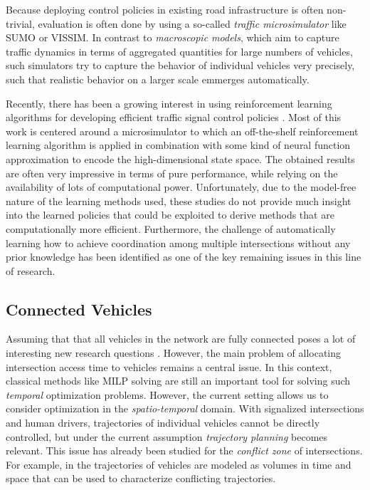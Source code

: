 \documentclass{article}
\begin{document}

Because deploying control policies in existing road infrastructure is often
non-trivial, evaluation is often done by using a so-called \textit{traffic
microsimulator} like SUMO \cite{lopez_microscopic_2018} or VISSIM. In contrast to
\textit{macroscopic models}, which aim to capture traffic dynamics in terms of
aggregated quantities for large numbers of vehicles, such simulators try to
capture the behavior of individual vehicles very precisely, such that realistic
behavior on a larger scale emmerges automatically.


Recently, there has been a growing interest in using reinforcement
learning algorithms for developing efficient traffic signal control policies
\cite{noaeen_reinforcement_2022}. Most of this work is centered around a microsimulator to which an off-the-shelf reinforcement learning algorithm is applied in combination with
some kind of neural function approximation to encode the high-dimensional state
space.
%
The obtained results are often very impressive in terms of pure performance,
while relying on the availability of lots of computational power. Unfortunately,
due to the model-free nature of the learning methods used, these studies do not
provide much insight into the learned policies that could be exploited to
derive methods that are computationally more efficient.
%
Furthermore, the challenge of automatically learning how to achieve coordination
among multiple intersections without any prior knowledge has been identified as
one of the key remaining issues in this line of research.


\subsection{Connected Vehicles}


Assuming that that all vehicles in the network are fully connected poses a lot
of interesting new research questions \cite{gholamhosseinian_comprehensive_nodate}. However, the main problem
of allocating intersection access time to vehicles remains a central issue. In
this context, classical methods like MILP solving \cite{fayazi_mixed-integer_2018} are still an
important tool for solving such \textit{temporal} optimization problems.
However, the current setting allows us to consider optimization in the
\textit{spatio-temporal} domain. With signalized intersections and human
drivers, trajectories of individual vehicles cannot be directly controlled, but
under the current assumption \textit{trajectory planning} becomes relevant.
This issue has already been
studied for the \textit{conflict zone} of intersections. For example, in
\cite{li_temporal-spatial_2019-1} the trajectories of vehicles are modeled as volumes in time and space
that can be used to characterize conflicting trajectories.
\end{document}
